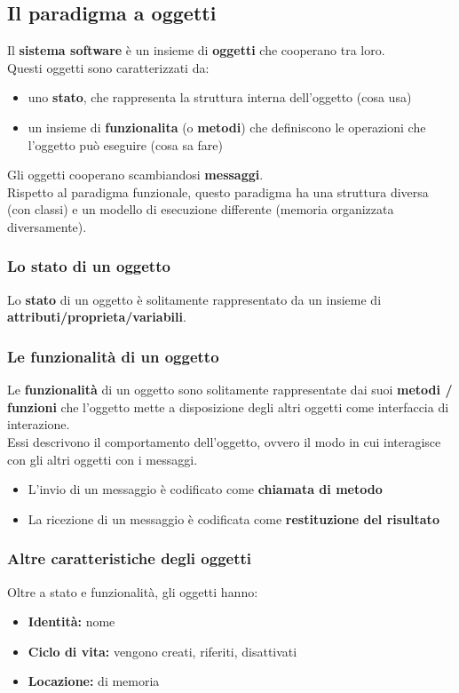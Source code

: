 \documentclass[12pt,a4paper]{article}
\begin{document}
\subsection{Il paradigma a oggetti}
Il \textbf{sistema software} è un insieme di \textbf{oggetti} che cooperano tra loro.\\
Questi oggetti sono caratterizzati da:
\begin{itemize}
  \item uno \textbf{stato}, che rappresenta la struttura interna dell'oggetto (cosa usa)
  \item un insieme di \textbf{funzionalita} (o \textbf{metodi}) che definiscono le operazioni che l'oggetto può eseguire (cosa sa fare)
\end{itemize}
Gli oggetti cooperano scambiandosi \textbf{messaggi}.\\
Rispetto al paradigma funzionale, questo paradigma ha una struttura diversa (con classi) e un modello di esecuzione differente (memoria organizzata diversamente).
\subsubsection{Lo stato di un oggetto}
Lo \textbf{stato} di un oggetto è solitamente rappresentato da un insieme di \textbf{attributi/proprieta/variabili}.
\subsubsection{Le funzionalità di un oggetto}
Le \textbf{funzionalità} di un oggetto sono solitamente rappresentate dai suoi \textbf{metodi / funzioni} che l'oggetto mette a disposizione degli altri oggetti come interfaccia di interazione.\\
Essi descrivono il comportamento dell'oggetto, ovvero il modo in cui interagisce con gli altri oggetti con i messaggi.
\begin{itemize}
  \item L'invio di un messaggio è codificato come \textbf{chiamata di metodo}
  \item La ricezione di un messaggio è codificata come \textbf{restituzione del risultato}
\end{itemize} 
\subsubsection{Altre caratteristiche degli oggetti}
Oltre a stato e funzionalità, gli oggetti hanno:
\begin{itemize}
  \item \textbf{Identità:} nome
  \item \textbf{Ciclo di vita:} vengono creati, riferiti, disattivati
  \item \textbf{Locazione:} di memoria
\end{itemize}
\end{document}
